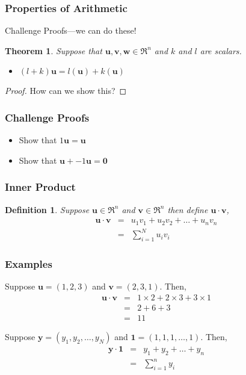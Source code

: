 \documentclass{beamer}
\newtheorem{thm}{Theorem}
\newtheorem{defn}{Definition}
\numberwithin{equation}{section}
\begin{document}
\begin{frame}
\frametitle{Properties of Arithmetic} 
\alert{Challenge Proofs}---we can do these!
\begin{thm} Suppose that $\boldsymbol{u}, \boldsymbol{v},\boldsymbol{w} \in \Re^{n}$ and $k$ and $l$ are scalars.  


\begin{itemize}
\item[c)] $(l + k) \boldsymbol{u} = l( \boldsymbol{u} ) + k (\boldsymbol{u}) $ 
\end{itemize}
\end{thm} 
\begin{proof} 
\alert{How can we show this?} 
\end{proof}
\end{frame}

\begin{frame}
\frametitle{Challenge Proofs}
\begin{itemize}
\item[-] Show that $1 \boldsymbol{u} = \boldsymbol{u}$ 
\item[-] Show that $\boldsymbol{u} + -1 \boldsymbol{u} = \boldsymbol{0}$
\end{itemize}

\end{frame}

\begin{frame}
\frametitle{Inner Product} 

\begin{defn} Suppose $\boldsymbol{u} \in \Re^{n}$ and $\boldsymbol{v} \in \Re^{n}$ then define $\boldsymbol{u} \cdot \boldsymbol{v}$, 
\begin{eqnarray}
\boldsymbol{u} \cdot \boldsymbol{v} &= & u_{1} v_{1} + u_{2}v_{2} + \hdots + u_{n} v_{n} \nonumber \\
														& = & \sum_{i=1}^{N} u_{i} v_{i} \nonumber
\end{eqnarray}														

\end{defn}

\end{frame}

\begin{frame}
\frametitle{Examples} 

Suppose $\boldsymbol{u} = (1, 2, 3) $ and $\boldsymbol{v} = (2, 3, 1) $.  Then, 
\begin{eqnarray}
\boldsymbol{u} \cdot \boldsymbol{v} & = & 1 \times 2 +  2 \times 3 +  3 \times 1 \nonumber \\
				& = & 2+ 6 + 3\nonumber \\
				& = & 11 \nonumber 				
\end{eqnarray}				

Suppose $\boldsymbol{y} = (y_{1}, y_{2}, \hdots, y_{N})$ and $\boldsymbol{1} = (1, 1, 1, \hdots, 1)$.  Then, 
\begin{eqnarray}
\boldsymbol{y} \cdot \boldsymbol{1} & = & y_{1} + y_{2} + \hdots + y_{n} \nonumber \\
														& = & \sum_{i=1}^{n} y_{i} \nonumber 
\end{eqnarray}														

\end{frame}
\end{document}
